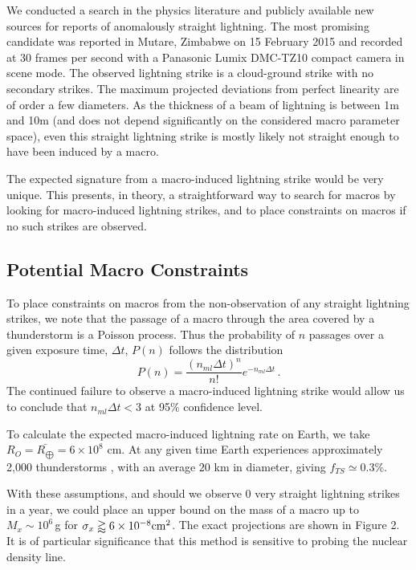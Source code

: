 \documentclass[%
 reprint,
 amsmath,amssymb,
 aps,
]{revtex4-2}
\begin{document}
        We conducted a search in the physics literature and publicly available new sources for reports of anomalously straight lightning. The most promising candidate was reported in Mutare, Zimbabwe on 15 February 2015 \cite{Zimbabwe} and recorded at 30 frames per second with a Panasonic Lumix DMC-TZ10 compact camera in scene mode. The observed lightning strike is a cloud-ground strike with no secondary strikes. The maximum projected deviations from perfect linearity are of order a few diameters. As the thickness of a beam of lightning is between 1m and 10m (and does not depend significantly on the considered macro parameter space), even this straight lightning strike is mostly likely not straight enough to have been induced by a macro.

        The expected signature from a macro-induced lightning strike would be very unique. This presents, in theory, a straightforward way to search for macros by looking for macro-induced lightning strikes, and to place constraints on macros if no such strikes are observed. 


    \subsection{Potential Macro Constraints} %
    \label{sub:macro_constraints_on_earth}

        To place constraints on macros from the non-observation of any straight lightning strikes, we note that the passage of a macro through the area covered by a thunderstorm is a Poisson process. Thus the probability of $n$ passages over a given exposure time, $\Delta t$, $P(n)$ follows the distribution
        \begin{equation}\label{eq:poisson}
            P(n) = \frac{\left({n_{ml} \Delta t}\right)^n}{n!} e^{-n_{ml} \Delta t}\,.
        \end{equation}
        The continued failure to observe a macro-induced lightning strike would allow us to conclude that $n_{ml}\Delta t<3$ at 95$\%$ confidence level.

        To calculate the expected macro-induced lightning rate on Earth,  we take $R_{O} = \bar{R_{\bigoplus}} = 6 \times 10^8$ cm.  At any given time Earth experiences approximately 2,000 thunderstorms \citep{NatGeo}, with an average $20$ km in diameter, giving $f_{TS}\simeq 0.3\%$.

        With these assumptions, and should we observe 0 very straight lightning strikes in a year, we could place an upper bound on the mass of a macro up to $M_x \sim 10^6\,$g for $\sigma_x\gtrapprox6\times10^{-8}{\rm cm}^2$. The exact projections are shown in Figure 2. It is of particular significance that this method is sensitive to probing the nuclear density line.
        
\end{document}
